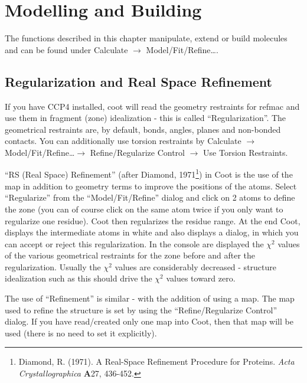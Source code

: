 \documentclass{book}
\begin{document}
\chapter{Modelling and Building}
\label{modelling,building}

The functions described in this chapter manipulate, extend or build
molecules and can be found under \textsf{Calculate $\rightarrow$
  Model/Fit/Refine\ldots}.

\section{Regularization and Real Space Refinement}
\label{sec:randr}
If you have CCP4 installed, coot will read the geometry restraints for
refmac and use them in fragment (zone) idealization - this is called
``Regularization''.  The geometrical restraints
are, by default, bonds, angles, planes and non-bonded
contacts.  You can additionally use torsion restraints by \textsf{Calculate $\rightarrow$
  Model/Fit/Refine\ldots $\rightarrow$ Refine/Regularize Control
  $\rightarrow$ Use Torsion Restraints}.




``RS (Real Space) Refinement'' (after Diamond,
1971\footnote{Diamond, R. (1971). A Real-Space Refinement Procedure
  for Proteins. \emph{Acta Crystallographica} \textbf{A}27, 436-452.
  }) in Coot is the use of the map in addition to geometry terms to
improve the positions of the atoms.  Select ``Regularize'' from the
``Model/Fit/Refine'' dialog and click on 2 atoms to define the zone
(you can of course click on the same atom twice if you only want to
regularize one residue).  Coot then regularizes the residue range.  At
the end Coot, displays the intermediate atoms in white and also
displays a dialog, in which you can accept or reject this
regularization.  In the console are displayed the $\chi^2$ values of
the various geometrical restraints for the zone before and after the
regularization.  Usually the $\chi^2$ values are considerably
decreased - structure idealization such as this should drive the
$\chi^2$ values toward zero.

The use of ``Refinement'' is similar - with the addition of using a
map.  The map used to refine the structure is set by using the
``Refine/Regularize Control'' dialog.  If you have read/created only
one map into Coot, then that map will be used (there is no need to set
it explicitly).
\end{document}
